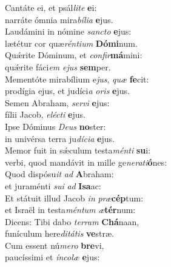 \evenverse Cantáte ei, et psál\textit{li}\textit{te} \textbf{e}i:~\*\\
\evenverse narráte ómnia mira\textit{bí}\textit{li}\textit{a} \textbf{e}jus.\\
\oddverse Laudámini in nómine \textit{san}\textit{cto} \textbf{e}jus:~\*\\
\oddverse lætétur cor quæ\textit{rén}\textit{ti}\textit{um} \textbf{Dó}\textbf{mi}num.\\
\evenverse Quǽrite Dóminum, et \textit{con}\textit{fir}\textbf{má}mini:~\*\\
\evenverse quǽrite fáci\textit{em} \textit{e}\textit{jus} \textbf{sem}per.\\
\oddverse Mementóte mirabílium e\textit{jus}, \textit{quæ} \textbf{fe}cit:~\*\\
\oddverse prodígia ejus, et judíci\textit{a} \textit{o}\textit{ris} \textbf{e}jus.\\
\evenverse Semen Abraham, \textit{ser}\textit{vi} \textbf{e}jus:~\*\\
\evenverse fílii Jacob, \textit{e}\textit{lé}\textit{cti} \textbf{e}jus.\\
\oddverse Ipse Dóminus \textit{De}\textit{us} \textbf{no}ster:~\*\\
\oddverse in univérsa terra ju\textit{dí}\textit{ci}\textit{a} \textbf{e}jus.\\
\evenverse Memor fuit in sǽculum testa\textit{mén}\textit{ti} \textbf{su}i:~\*\\
\evenverse verbi, quod mandávit in mille ge\textit{ne}\textit{ra}\textit{ti}\textbf{ó}nes:\\
\oddverse Quod dispósu\textit{it} \textit{ad} \textbf{A}braham:~\*\\
\oddverse et juraménti \textit{su}\textit{i} \textit{ad} \textbf{I}\textbf{sa}ac:\\
\evenverse Et státuit illud Jacob \textit{in} \textit{præ}\textbf{cép}tum:~\*\\
\evenverse et Israël in testa\textit{mén}\textit{tum} \textit{æ}\textbf{tér}num:\\
\oddverse Dicens: Tibi dabo \textit{ter}\textit{ram} \textbf{Chá}naan,~\*\\
\oddverse funículum here\textit{di}\textit{tá}\textit{tis} \textbf{ve}stræ.\\
\evenverse Cum essent nú\textit{me}\textit{ro} \textbf{bre}vi,~\*\\
\evenverse paucíssimi et \textit{ín}\textit{co}\textit{læ} \textbf{e}jus:\\
